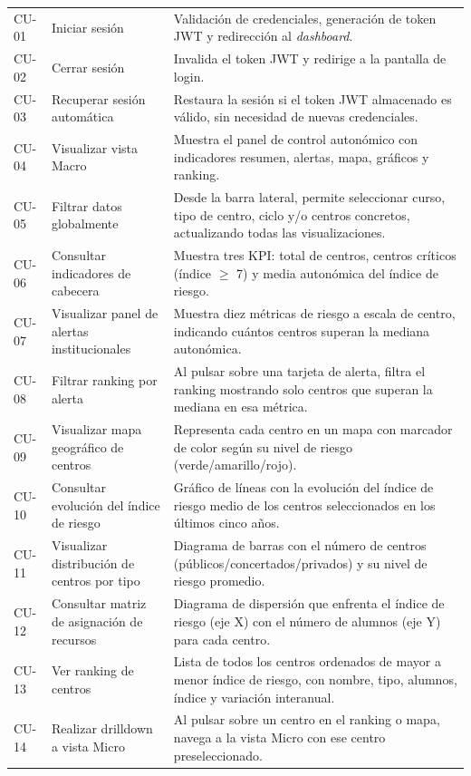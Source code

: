 \begin{longtable}{>{\raggedright\arraybackslash}p{1.5cm} 
                   >{\raggedright\arraybackslash}p{3.5cm} 
                   >{\raggedright\arraybackslash}p{7.0cm}}
CU-01 & Iniciar sesión & Validación de credenciales, generación de token JWT y redirección al \textit{dashboard}. \\
CU-02 & Cerrar sesión & Invalida el token JWT y redirige a la pantalla de login. \\
CU-03 & Recuperar sesión automática & Restaura la sesión si el token JWT almacenado es válido, sin necesidad de nuevas credenciales. \\
\hline
CU-04 & Visualizar vista Macro & Muestra el panel de control autonómico con indicadores resumen, alertas, mapa, gráficos y ranking. \\
CU-05 & Filtrar datos globalmente & Desde la barra lateral, permite seleccionar curso, tipo de centro, ciclo y/o centros concretos, actualizando todas las visualizaciones. \\
CU-06 & Consultar indicadores de cabecera & Muestra tres KPI: total de centros, centros críticos (índice $\ge$ 7) y media autonómica del índice de riesgo. \\
CU-07 & Visualizar panel de alertas institucionales & Muestra diez métricas de riesgo a escala de centro, indicando cuántos centros superan la mediana autonómica. \\
CU-08 & Filtrar ranking por alerta & Al pulsar sobre una tarjeta de alerta, filtra el ranking mostrando solo centros que superan la mediana en esa métrica. \\
CU-09 & Visualizar mapa geográfico de centros & Representa cada centro en un mapa con marcador de color según su nivel de riesgo (verde/amarillo/rojo). \\
CU-10 & Consultar evolución del índice de riesgo & Gráfico de líneas con la evolución del índice de riesgo medio de los centros seleccionados en los últimos cinco años. \\
CU-11 & Visualizar distribución de centros por tipo & Diagrama de barras con el número de centros (públicos/concertados/privados) y su nivel de riesgo promedio. \\
CU-12 & Consultar matriz de asignación de recursos & Diagrama de dispersión que enfrenta el índice de riesgo (eje X) con el número de alumnos (eje Y) para cada centro. \\
CU-13 & Ver ranking de centros & Lista de todos los centros ordenados de mayor a menor índice de riesgo, con nombre, tipo, alumnos, índice y variación interanual. \\
CU-14 & Realizar drilldown a vista Micro & Al pulsar sobre un centro en el ranking o mapa, navega a la vista Micro con ese centro preseleccionado. \\

\end{longtable}
